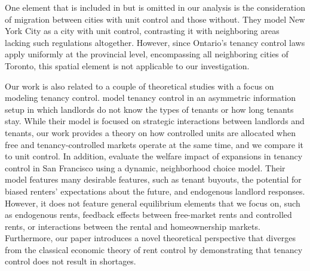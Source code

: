 \documentclass[parskip=full]{article}
\begin{document}
One element that is included in \citet{fmn-2023} but is omitted in our analysis is the consideration of migration between cities with unit control and those without. They model New York City as a city with unit control, contrasting it with neighboring areas lacking such regulations altogether. However, since Ontario's tenancy control laws apply uniformly at the provincial level, encompassing all neighboring cities of Toronto, this spatial element is not applicable to our investigation.

Our work is also related to a couple of theoretical studies with a focus on modeling tenancy control. \citet{be-2000} model tenancy control in an asymmetric information setup in which landlords do not know the types of tenants or how long tenants stay. While their model is focused on strategic interactions between landlords and tenants, our work provides a theory on how controlled units are allocated when free and tenancy-controlled markets operate at the same time, and we compare it to unit control. In addition, \citet{diamond-2019} evaluate the welfare impact of expansions in tenancy control in San Francisco using a dynamic, neighborhood choice model. Their model features many desirable features, such as tenant buyouts, the potential for biased renters' expectations about the future, and endogenous landlord responses. However, it does not feature general equilibrium elements that we focus on, such as endogenous rents, feedback effects between free-market rents and controlled rents, or interactions between the rental and homeownership markets. Furthermore, our paper introduces a novel theoretical perspective that diverges from the classical economic theory of rent control by demonstrating that tenancy control does not result in shortages.
\end{document}

